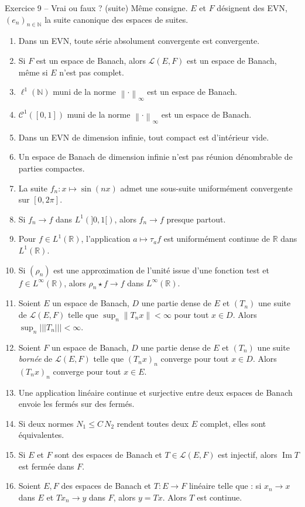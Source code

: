 \documentclass[11pt,a4paper]{article}
\newcommand{\R}{\mathbb{R}}
\newcommand{\N}{\mathbb{N}}
\newcommand{\norm}[1]{\left\|#1\right\|}
\newcommand{\opnorm}[1]{|\!|\!|#1|\!|\!|}
\newcommand{\Lc}{\mathcal{L}}
\DeclareMathOperator{\Ima}{Im}
\theoremstyle{definition}
\begin{document}
\begin{exo}{Exercice 9 -- Vrai ou faux ? (suite)}
Même consigne. $E$ et $F$ désignent des EVN, $(e_n)_{n\in\N}$ la suite canonique des espaces de suites.
\begin{enumerate}[label=\arabic*.]
  \item Dans un EVN, toute série absolument convergente est convergente.
  \item Si $F$ est un espace de Banach, alors $\Lc(E,F)$ est un espace de Banach, même si $E$ n'est pas complet.
  \item $\ell^1(\N)$ muni de la norme $\norm\cdot_\infty$ est un espace de Banach.
  \item $\mathcal C^1([0,1])$ muni de la norme $\norm\cdot_\infty$ est un espace de Banach.
  \item Dans un EVN de dimension infinie, tout compact est d'intérieur vide.
  \item Un espace de Banach de dimension infinie n'est pas réunion dénombrable de parties compactes.
  \item La suite $f_n:x\mapsto\sin(nx)$ admet une sous-suite uniformément convergente sur $[0,2\pi]$.
  \item Si $f_n\to f$ dans $L^1(]0,1[)$, alors $f_n\to f$ presque partout.
  \item Pour $f\in L^1(\R)$, l'application $a\mapsto\tau_af$ est uniformément continue de $\R$ dans $L^1(\R)$.
  \item Si $(\rho_n)$ est une approximation de l'unité issue d'une fonction test et $f\in L^\infty(\R)$, alors $\rho_n\star f\to f$ dans $L^\infty(\R)$.
  \item Soient $E$ un espace de Banach, $D$ une partie dense de $E$ et $(T_n)$ une suite de $\Lc(E,F)$ telle que $\sup_n\norm{T_nx}<\infty$ pour tout $x\in D$. Alors $\sup_n\opnorm{T_n}<\infty$.
  \item Soient $F$ un espace de Banach, $D$ une partie dense de $E$ et $(T_n)$ une suite \emph{bornée} de $\Lc(E,F)$ telle que $(T_nx)_n$ converge pour tout $x\in D$. Alors $(T_nx)_n$ converge pour tout $x\in E$.
  \item Une application linéaire continue et surjective entre deux espaces de Banach envoie les fermés sur des fermés.
  \item Si deux normes $N_1\le C\,N_2$ rendent toutes deux $E$ complet, elles sont équivalentes.
  \item Si $E$ et $F$ sont des espaces de Banach et $T\in\Lc(E,F)$ est injectif, alors $\Ima T$ est fermée dans $F$.
  \item Soient $E,F$ des espaces de Banach et $T:E\to F$ linéaire telle que : si $x_n\to x$ dans $E$ et $Tx_n\to y$ dans $F$, alors $y=Tx$. Alors $T$ est continue.
\end{enumerate}
\end{exo}
\end{document}

